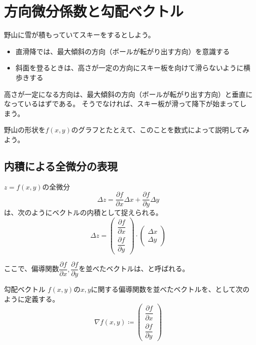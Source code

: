\documentclass[../../../topic_calculus]{subfiles}
\begin{document}
\sectionline
\section{方向微分係数と勾配ベクトル}

野山に雪が積もっていてスキーをするとしよう。

\begin{itemize}
  \item 直滑降では、最大傾斜の方向（ボールが転がり出す方向）を意識する
  \item 斜面を登るときは、高さが一定の方向にスキー板を向けて滑らないように横歩きする
\end{itemize}

高さが一定になる方向は、最大傾斜の方向（ボールが転がり出す方向）と垂直になっているはずである。
そうでなければ、スキー板が滑って降下が始まってしまう。

\br

野山の形状を$f(x,y)$のグラフとたとえて、このことを数式によって説明してみよう。

\subsection{内積による全微分の表現}

$z=f(x,y)$の全微分
\begin{equation*}
  \Delta z = \frac{\partial f}{\partial x}\Delta x + \frac{\partial f}{\partial y}\Delta y
\end{equation*}
は、次のようにベクトルの内積として捉えられる。
\begin{equation*}
  \Delta z = \begin{pmatrix} \dfrac{\partial f}{\partial x} \\ \dfrac{\partial f}{\partial y} \end{pmatrix} \cdot \begin{pmatrix} \Delta x \\ \Delta y \end{pmatrix}
\end{equation*}

ここで、偏導関数$\dfrac{\partial f}{\partial x},\dfrac{\partial f}{\partial y}$を並べたベクトルは、と呼ばれる。

\begin{definition}{勾配ベクトル}\label{def:gradient}
  $f(x,y)$の$x,y$に関する偏導関数を並べたベクトルを、として次のように定義する。
  \begin{equation}
    \nabla f(x,y) \coloneqq \begin{pmatrix} \dfrac{\partial f}{\partial x} \\ \dfrac{\partial f}{\partial y} \end{pmatrix}
  \end{equation}
\end{definition}
\end{document}
